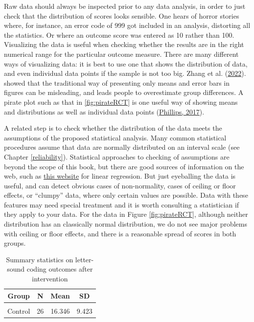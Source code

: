 \documentclass{krantz}
\begin{document}
Raw data should always be inspected prior to any data analysis, in order to just check that the distribution of scores looks sensible. One hears of horror stories where, for instance, an error code of 999 got included in an analysis, distorting all the statistics. Or where an outcome score was entered as 10 rather than 100. Visualizing the data is useful when checking whether the results are in the right numerical range for the particular outcome measure. There are many different ways of visualizing data: it is best to use one that shows the distribution of data, and even individual data points if the sample is not too big. Zhang et al. (\protect\hyperlink{ref-zhang2022}{2022}). showed that the traditional way of presenting only means and error bars in figures can be misleading, and leads people to overestimate group differences.
A pirate plot such as that in \ref{fig:pirateRCT} is one useful way of showing means and distributions as well as individual data points (\protect\hyperlink{ref-phillips2017}{Phillips, 2017}).

A related step is to check whether the distribution of the data meets the assumptions of the proposed statistical analysis. Many common statistical procedures assume that data are normally distributed on an interval scale (see Chapter \ref{reliability}). Statistical approaches to checking of assumptions are beyond the scope of this book, but there are good sources of information on the web, such as \href{http://www.sthda.com/english/articles/39-regression-model-diagnostics/161-linear-regression-assumptions-and-diagnostics-in-r-essentials/}{this website} for linear regression. But just eyeballing the data is useful, and can detect obvious cases of non-normality, cases of ceiling or floor effects, or ``clumpy'' data, where only certain values are possible. Data with these features may need special treatment and it is worth consulting a statistician if they apply to your data. For the data in Figure \ref{fig:pirateRCT}, although neither distribution has an classically normal distribution, we do not see major problems with ceiling or floor effects, and there is a reasonable spread of scores in both groups.

\begin{table}

\caption{\label{tab:table2gp}Summary statistics on letter-sound coding outcomes after intervention}
\centering
\begin{tabular}[t]{cccc}
\toprule
Group & N & Mean & SD\\
\midrule
\cellcolor{gray!6}{Intervention} & \cellcolor{gray!6}{28} & \cellcolor{gray!6}{22.286} & \cellcolor{gray!6}{7.282}\\
Control & 26 & 16.346 & 9.423\\
\bottomrule
\end{tabular}
\end{table}
\end{document}
